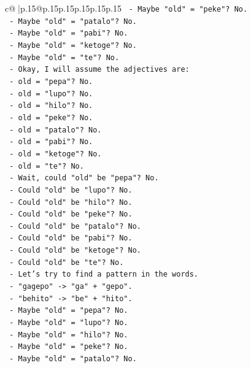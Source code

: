 \documentclass{article}
\begin{document}
{\begin{supertabular}{c@{$\;$}|p{.15\linewidth}@{}p{.15\linewidth}p{.15\linewidth}p{.15\linewidth}p{.15\linewidth}p{.15\linewidth}}
{{{\texttt{      {-} Maybe "old" = "peke"? No.} \\
\texttt{      {-} Maybe "old" = "patalo"? No.} \\
\texttt{      {-} Maybe "old" = "pabi"? No.} \\
\texttt{      {-} Maybe "old" = "ketoge"? No.} \\
\texttt{      {-} Maybe "old" = "te"? No.} \\
\texttt{      {-} Okay, I will assume the adjectives are:} \\
\texttt{        {-} old = "pepa"? No.} \\
\texttt{        {-} old = "lupo"? No.} \\
\texttt{        {-} old = "hilo"? No.} \\
\texttt{        {-} old = "peke"? No.} \\
\texttt{        {-} old = "patalo"? No.} \\
\texttt{        {-} old = "pabi"? No.} \\
\texttt{        {-} old = "ketoge"? No.} \\
\texttt{        {-} old = "te"? No.} \\
\texttt{      {-} Wait, could "old" be "pepa"? No.} \\
\texttt{      {-} Could "old" be "lupo"? No.} \\
\texttt{      {-} Could "old" be "hilo"? No.} \\
\texttt{      {-} Could "old" be "peke"? No.} \\
\texttt{      {-} Could "old" be "patalo"? No.} \\
\texttt{      {-} Could "old" be "pabi"? No.} \\
\texttt{      {-} Could "old" be "ketoge"? No.} \\
\texttt{      {-} Could "old" be "te"? No.} \\
\texttt{      {-} Let's try to find a pattern in the words.} \\
\texttt{      {-} "gagepo" {-}> "ga" + "gepo".} \\
\texttt{      {-} "behito" {-}> "be" + "hito".} \\
\texttt{      {-} Maybe "old" = "pepa"? No.} \\
\texttt{      {-} Maybe "old" = "lupo"? No.} \\
\texttt{      {-} Maybe "old" = "hilo"? No.} \\
\texttt{      {-} Maybe "old" = "peke"? No.} \\
\texttt{      {-} Maybe "old" = "patalo"? No.} \\
}}}
\end{supertabular}}
\end{document}
